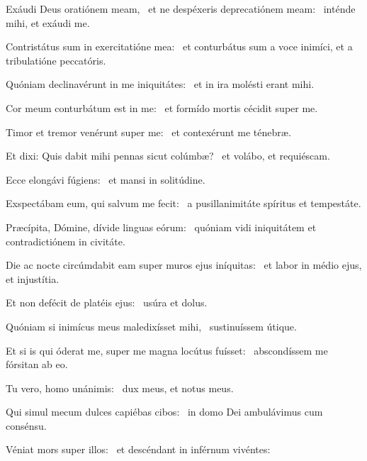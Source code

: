 \item Exáudi Deus oratiónem meam,~\pscross{} et ne despéxeris deprecatiónem meam:~\psstar{} inténde mihi, et exáudi me.

\item Contristátus sum in exercitatióne mea:~\psstar{} et conturbátus sum a voce inimíci, et a tribulatióne peccatóris.

\item Quóniam declinavérunt in me iniquitátes:~\psstar{} et in ira molésti erant mihi.

\item Cor meum conturbátum est in me:~\psstar{} et formído mortis cécidit super me.

\item Timor et tremor venérunt super me:~\psstar{} et contexérunt me ténebræ.

\item Et dixi: Quis dabit mihi pennas sicut colúmbæ?~\psstar{} et volábo, et requiéscam.

\item Ecce elongávi fúgiens:~\psstar{} et mansi in solitúdine.

\item Exspectábam eum, qui salvum me fecit:~\psstar{} a pusillanimitáte spíritus et tempestáte.

\item Præcípita, Dómine, dívide linguas eórum:~\psstar{} quóniam vidi iniquitátem et contradictiónem in civitáte.

\item Die ac nocte circúmdabit eam super muros ejus iníquitas:~\psstar{} et labor in médio ejus, et injustítia.

\item Et non defécit de platéis ejus:~\psstar{} usúra et dolus.

\item Quóniam si inimícus meus maledixísset mihi,~\psstar{} sustinuíssem útique.

\item Et si is qui óderat me, super me magna locútus fuísset:~\psstar{} abscondíssem me fórsitan ab eo.

\item Tu vero, homo unánimis:~\psstar{} dux meus, et notus meus.

\item Qui simul mecum dulces capiébas cibos:~\psstar{} in domo Dei ambulávimus cum consénsu.

\item Véniat mors super illos:~\psstar{} et descéndant in inférnum vivéntes:

